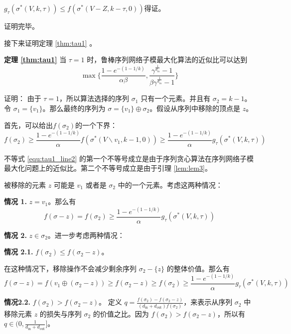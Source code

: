 $g_{\tau}(\sigma^*(V,k,\tau)) \le f(\sigma^*(V-Z,k-\tau,0))$得证。

\noindent 证明完毕。

接下来证明定理 \ref{thm:tau1} 。

\noindent \textbf{定理 \ref{thm:tau1}} 当 $\tau=1$ 时，鲁棒序列网络子模最大化算法的近似比可以达到
\begin{equation*}
\max\{\frac{1-e^{-(1-1/k)}}{\alpha\beta},\frac{\gamma^{\frac{1}{d_{\text{in}}}}-1}{\beta \gamma^{\frac{1}{d_{\text{in}}}}-1}\}\end{equation*}

\noindent 证明：
由于 $\tau=1$，所以算法选择的序列 $\sigma_1$ 只有一个元素。并且有 $\sigma_2=k-1$。令 $\sigma_1=\{v_1\}$。那么最终的序列为 $\sigma= \{v_1\} \oplus \sigma_2$。假设从序列中移除的顶点是 $z$。

首先，可以给出$f(\sigma_2)$的一个下界：
\begin{equation}
    f(\sigma_2)  \ge \frac{1-e^{-(1-1/k)}}{\alpha} f(\sigma^*(V\backslash v_1,k-1,0))
     \ge \frac{1-e^{-(1-1/k)}}{\alpha} g_\tau(\sigma^*(V,k,\tau)) \label{equ:tau1_line2}
\end{equation}

不等式 \ref{equ:tau1_line2} 的第一个不等号成立是由于序列贪心算法在序列网络子模最大化问题上的近似比\cite{mitrovic2018submodularity}。第二个不等号成立是由于引理 \ref{lem:lem3}。

被移除的元素 $z$ 可能是 $v_1$ 或者是 $\sigma_2$ 中的一个元素。考虑这两种情况：

\textbf{情况 1.} $z=v_1$。那么有
\begin{equation}
f(\sigma -z ) = f(\sigma_2) \ge \frac{1-e^{-(1-1/k)}}{\alpha} g_\tau(\sigma^*(V,k,\tau))
\end{equation}

\textbf{情况 2.} $z\in \sigma_2$。进一步考虑两种情况：

\textbf{情况 2.1.} $f(\sigma_2) \le f(\sigma_2-z)$。

在这种情况下，移除操作不会减少剩余序列 $\sigma_2-\{z\}$ 的整体价值。那么有
\begin{equation}
    f(\sigma-z)  =f(v_1 \oplus (\sigma_2-z)) \ge f(\sigma_2-z)
     \ge f(\sigma_2) \ge \frac{1-e^{-(1-1/k)}}{\alpha} g_\tau(\sigma^*(V,k,\tau))
\end{equation}

\textbf{情况2.2.} $f(\sigma_2) > f(\sigma_2-z)$。
定义 $q= \frac{f(\sigma_2)-f(\sigma_2-z)}{(d_{\text{in}}+d_{\text{out}})f(\sigma_2)}$，来表示从序列 $\sigma_2$ 中移除元素 $z$ 的损失与序列 $\sigma_2$ 的价值之比。因为 $f(\sigma_2) > f(\sigma_2-z)$，所以有 $q\in (0,\frac{1}{d_{\text{in}}+d_{\text{out}}}]$。

